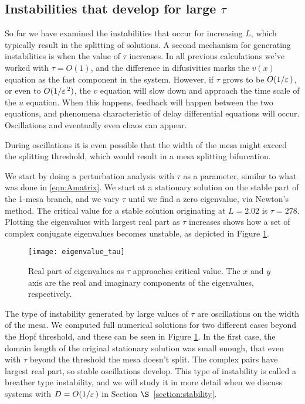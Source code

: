 \subsection{Instabilities that develop for large $\tau$}

So far we have examined the instabilities that occur for increasing $L$, which typically result in the splitting of solutions. A second mechanism for generating instabilities is when the value of $\tau$ increases. In all previous calculations we've worked with $\tau=O(1)$, and the difference in difusivities marks the $v(x)$ equation as the fast component in the system. However, if $\tau$ grows to be $O(1/\varepsilon\,)$, or even to $O(1/\varepsilon\,^2)$, the $v$ equation will slow down and approach the time scale of the $u$ equation. When this happens, feedback will happen between the two equations, and phenomena characteristic of delay differential equations will occur. Oscillations and eventually even chaos can appear. 

During oscillations it is even possible that the width of the mesa might exceed the splitting threshold, which would result in a mesa splitting bifurcation.

We start by doing a perturbation analysis with $\tau$ as a parameter, similar to what was done in \eqref{eqn:Amatrix}. We start at a stationary solution on the stable part of the 1-mesa branch, and we vary $\tau$ until we find a zero eigenvalue, via Newton's method. The critical value for a stable solution originating at $L=2.02$ is $\tau=278$. Plotting the eigenvalues with largest real part as $\tau$ increases shows how a set of complex conjugate eigenvalues becomes unstable, as depicted in Figure \ref{fig:eigs2}.

% 
\begin{figure}[htb]
\begin{center}
\texttt{[image: eigenvalue\_tau]}
\caption{Real part of eigenvalues as $\tau$ approaches critical value. The $x$ and $y$ axis are the real and imaginary components of the eigenvalues, respectively.}
\label{fig:eigs2}
\end{center}
\end{figure}
% 

The type of instability generated by large values of $\tau$ are oscillations on the width of the mesa. We computed full numerical solutions for two different cases beyond the Hopf threshold, and these can be seen in Figure \ref{fig:eigs2}. In the first case, the domain length of the original stationary solution was small enough, that even with $\tau$ beyond the threshold the mesa doesn't split. The complex pairs have largest real part, so stable oscillations develop. This type of instability is called a breather type instability, and we will study it in more detail when we discuss systems with $D=O(1/\varepsilon\,)$ in Section $\S$~\ref{section:stability}. 

